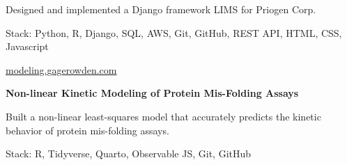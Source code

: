 \documentclass{resume}
\begin{document}
\begin{highlights}
    \item Designed and implemented a Django framework LIMS for Priogen Corp.
    \item Stack: Python, R, Django, SQL, AWS, Git, GitHub, REST API, HTML, CSS,
Javascript
\end{highlights}

\begin{software}{\href{https:://modeling.gagerowden.com}{modeling.gagerowden.com}}

\textbf{Non-linear Kinetic Modeling of Protein Mis-Folding Assays}

\end{software}

\begin{highlights}
    \item Built a non-linear least-squares model that accurately predicts the
kinetic behavior of protein mis-folding assays.
    \item Stack: R, Tidyverse, Quarto, Observable JS, Git, GitHub
\end{highlights}
\end{document}
